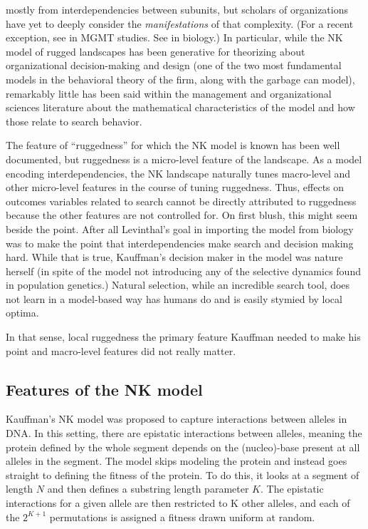 \documentclass[12pt]{article}
\begin{document}
mostly from interdependencies between subunits, but scholars of organizations have yet to deeply consider the \textit{manifestations} of that complexity. (For a recent exception, see \citet{Rahmandad2019} in MGMT studies. See \citet{Newman1998} in biology.) In particular, while the NK model of rugged landscapes \cite{Kauffman1989,Levinthal2007,Rivkin2000} has been generative for theorizing about organizational decision-making and design (one of the two most fundamental models in the behavioral theory of the firm, along with the garbage can model), remarkably little has been said within the management and organizational sciences literature about the mathematical characteristics of the model and how those relate to search behavior.

The feature of ``ruggedness'' for which the NK model is known has been well documented, but ruggedness is a micro-level feature of the landscape. As a model encoding interdependencies, the NK landscape naturally tunes macro-level and other micro-level features in the course of tuning ruggedness. Thus, effects on outcomes variables related to search cannot be directly attributed to ruggedness because the other features are not controlled for. On first blush, this might seem beside the point. After all Levinthal's goal in importing the model from biology was to make the point that interdependencies make search and decision making hard. While that is true, Kauffman's decision maker in the model was nature herself (in spite of the model not introducing any of the selective dynamics found in population genetics.) Natural selection, while an incredible search tool, does not learn in a model-based way has humans do and is easily stymied by local optima.

In that sense, local ruggedness the primary feature Kauffman needed to make his point and macro-level features did not really matter.





\subsection*{Features of the NK model}



Kauffman's NK model was proposed to capture interactions between alleles in DNA. In this setting, there are epistatic interactions between alleles, meaning the protein defined by the whole segment depends on the (nucleo)-base present at all alleles in the segment. The model skips modeling the protein and instead goes straight to defining the fitness of the protein. To do this, it looks at a segment of length $N$ and then defines a substring length parameter $K$. The epistatic interactions for a given allele are then restricted to K other alleles, and each of the $2^{K+1}$ permutations is assigned a fitness drawn uniform at random.
\end{document}
